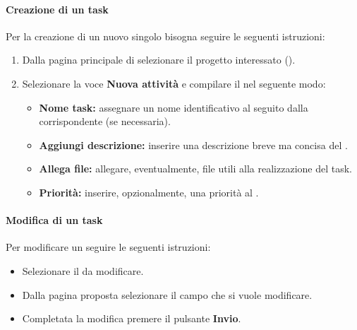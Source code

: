 \paragraph{Creazione di un task}
Per la creazione di un nuovo singolo  bisogna seguire le seguenti
istruzioni:
\begin{enumerate}
  \item Dalla pagina principale di  selezionare il progetto interessato (\progetto).
  \item Selezionare la voce \textbf{Nuova attività} e compilare il  nel seguente modo:
    \begin{itemize}
      \item \textbf{Nome task:} assegnare un nome identificativo al  seguito dalla  corrispondente (se necessaria).
      \item \textbf{Aggiungi descrizione:} inserire una descrizione breve ma
      concisa del .
      \item \textbf{Allega file:} allegare, eventualmente, file utili alla realizzazione del task.
      \item \textbf{Priorità:} inserire, opzionalmente, una priorità al .
    \end{itemize}
\end{enumerate}


\paragraph{Modifica di un task}
Per modificare un  seguire le seguenti istruzioni:
\begin{itemize}
  \item Selezionare il  da modificare.
  \item Dalla pagina proposta selezionare il campo che si vuole modificare.
  \item Completata la modifica premere il pulsante \textbf{Invio}.
\end{itemize}

